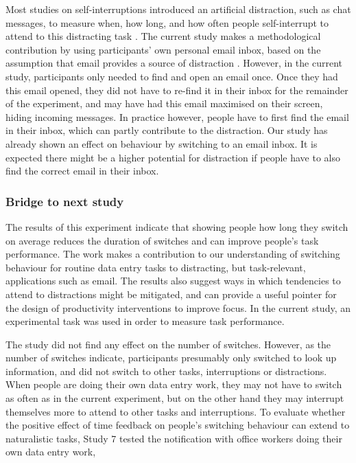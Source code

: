 Most studies on self-interruptions introduced an artificial distraction, such as chat messages, to measure when, how long, and how often people self-interrupt to attend to this distracting task \citep{Katidioti2013, Salvucci2010}. The current study makes a methodological contribution by using participants' own personal email inbox, based on the assumption that email provides a source of distraction \citep{Hanrahan2015, Mark2016}. However, in the current study, participants only needed to find and open an email once. Once they had this email opened, they did not have to re-find it in their inbox for the remainder of the experiment, and may have had this email maximised on their screen, hiding incoming messages. In practice however, people have to first find the email in their inbox, which can partly contribute to the distraction. Our study has already shown an effect on behaviour by switching to an email inbox. It is expected there might be a higher potential for distraction if people have to also find the correct email in their inbox.

\subsubsection{Bridge to next study}
The results of this experiment indicate that showing people how long they switch on average reduces the duration of switches and can improve people's task performance. The work makes a contribution to our understanding of switching behaviour for routine data entry tasks to distracting, but task-relevant, applications such as email. The results also suggest ways in which tendencies to attend to distractions might be mitigated, and can provide a useful pointer for the design of productivity interventions to improve focus. In the current study, an experimental task was used in order to measure task performance. 

The study did not find any effect on the number of switches. However, as the number of switches indicate, participants presumably only switched to look up information, and did not switch to other tasks, interruptions or distractions. When people are doing their own data entry work, they may not have to switch as often as in the current experiment, but on the other hand they may interrupt themselves more to attend to other tasks and interruptions. To evaluate whether the positive effect of time feedback on people's switching behaviour can extend to naturalistic tasks, Study 7 tested the notification with office workers doing their own data entry work,

